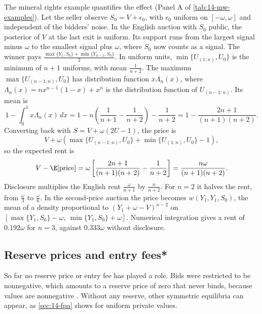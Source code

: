 The mineral rights example quantifies the effect (Panel A of \cref{tab:14-mw-examples}). Let the seller observe
$S_0=V+\epsilon_0$, with $\epsilon_0$ uniform on $[-\omega,\omega]$ and independent of the bidders' noise. In
the English auction with $S_0$ public, the posterior of $V$ at the last exit is uniform. Its support runs from
the largest signal minus $\omega$ to the smallest signal plus $\omega$, where $S_0$ now counts as a signal.
The winner pays
$\frac{\max\{Y_1,S_0\}+\min\{Y_{n-1},S_0\}}{2}$. In uniform units, $\min\{U_{(1:n)},U_0\}$ is the minimum of
$n+1$ uniforms, with mean $\frac{1}{n+2}$. The maximum $\max\{U_{(n-1:n)},U_0\}$ has distribution function
$x\Lambda_n(x)$, where $\Lambda_n(x)=nx^{n-1}(1-x)+x^n$ is the distribution function of $U_{(n-1:n)}$. Its
mean is
\begin{equation*}
  1-\int_0^1x\Lambda_n(x)\,dx=1-n\left(\frac{1}{n+1}-\frac{1}{n+2}\right)-\frac{1}{n+2}
  =1-\frac{2n+1}{(n+1)(n+2)}.
\end{equation*}
Converting back with $S=V+\omega(2U-1)$, the price is
\begin{equation*}
  V+\omega\left(\max\{U_{(n-1:n)},U_0\}+\min\{U_{(1:n)},U_0\}-1\right),
\end{equation*}
so the expected rent is
\begin{equation*}
  V-\E[\text{price}]=\omega\left[\frac{2n+1}{(n+1)(n+2)}-\frac{1}{n+2}\right]=\frac{n\omega}{(n+1)(n+2)}.
\end{equation*}
Disclosure multiplies the English rent $\frac{\omega}{n+1}$ by $\frac{n}{n+2}$. For $n=2$ it halves the
rent, from $\frac{\omega}{3}$ to $\frac{\omega}{6}$. In the second-price auction the price becomes
$w(Y_1,Y_1,S_0)$, the mean of a density proportional to $(Y_1+\omega-V)^{n-2}$ on
$[\max\{Y_1,S_0\}-\omega,\ \min\{Y_1,S_0\}+\omega]$. Numerical integration gives a rent of $0.192\omega$ for
$n=3$, against $0.333\omega$ without disclosure.

\subsection{Reserve prices and entry fees*}\label{sec:14-mw-reserve}

So far no reserve price or entry fee has played a role. Bids were restricted to be nonnegative, which amounts
to a reserve price of zero that never binds, because values are nonnegative
\citep[footnote~25]{MilgromWeber1982}. Without any reserve, other symmetric equilibria can appear, as
\cref{sec:14-fpa} shows for uniform private values.

